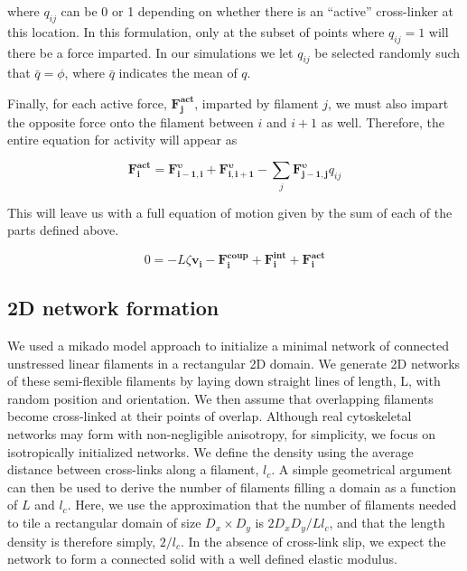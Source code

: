 \documentclass[10pt,letterpaper]{article}
\begin{document}
where $q_{ij}$ can be 0 or 1 depending on whether there is an ``active'' cross-linker at this location.  In this formulation, only at the subset of points where $q_{ij}=1$ will there be a force imparted.  In our simulations we let $q_{ij}$ be selected randomly such that $\bar{q}=\phi$, where $\bar{q}$ indicates the mean of $q$.



Finally, for each active force, $\mathbf{F^{act}_j}$, imparted by filament $j$, we must also impart the opposite force onto the filament between $i$ and $i+1$ as well.  Therefore, the entire equation for activity will appear as

\begin{equation}
\label{eqn:active}
\mathbf{F^{act}_{i}}=\mathbf{F^{\upsilon}_{i-1,i}} + \mathbf{F^{\upsilon}_{i,i+1}}
- \sum_{j}\mathbf{F^{\upsilon}_{j-1,j}}q_{ij}
\end{equation}


This will leave us with a full equation of motion given by the sum of each of the parts defined above.

\begin{equation}
\label{eqn:syst3}
0=-L\zeta\mathbf{ v_i} -\mathbf{F^{coup}_i}+ \mathbf{F^{int}_i}+\mathbf{F^{act}_i} 
\end{equation}

\subsection*{2D network formation}

We used a mikado model approach \cite{Unterberger2014} to initialize a minimal network of connected unstressed linear filaments in a rectangular 2D domain. We generate 2D networks of these semi-flexible filaments by laying down straight lines of length, L, with random position and orientation. We then assume that overlapping filaments become cross-linked at their points of overlap. Although real cytoskeletal networks may form with non-negligible anisotropy, for simplicity, we focus on isotropically initialized networks. We define the density using the average distance between cross-links along a filament, $l_c$. A simple geometrical argument can then be used to derive the number of filaments filling a domain as a function of $L$ and $l_c$\cite{theo_hlm}.  Here, we use the approximation that the number of filaments needed to tile a rectangular domain of size $D_x \times D_y$  is $2D_xD_y/Ll_c$, and that the length density is therefore simply, $2/l_c$. In the absence of cross-link slip, we expect the network to form a connected solid with a well defined elastic modulus\cite{theo_hlm,theo_hlm2}.
\end{document}
